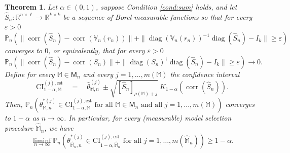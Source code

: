 \documentclass[preprint]{imsart}
\newcommand{\R}{{\mathbb R}}
\newcommand{\eps}{\varepsilon}
\newcommand{\M}{\mathbb M}
\DeclareMathOperator{\diag}{diag}
\DeclareMathOperator{\corr}{corr}
\newtheorem{theorem}{Theorem}[section]
\numberwithin{equation}{section}
\begin{document}
\begin{theorem}\label{thm:fbl}
Let $\alpha \in (0, 1)$, suppose Condition \ref{cond:sum} holds, and let $\hat{S}_n: \R^{n \times \ell} \to \R^{k \times k}$ be a sequence of Borel-measurable functions so that for every $\varepsilon > 0$ 
%
\begin{equation*} 
\mathbb{P}_n \left( \|\corr(\hat{S}_n) - \corr\left(\mathbb{V}_n(r_n)\right)\|  + \|
\diag(\mathbb{V}_n(r_n))^{-1} \diag(\hat{S}_n) - I_k \| \geq \eps \right)
\end{equation*}
%
converges to $0$, or equivalently, that for every $\varepsilon > 0$
%
\begin{equation} \label{eq:consest}
\mathbb{P}_n \left( \|\corr(\hat{S}_n) - \corr\left(S_n\right)\|  + \|
\diag(S_n)^{\dagger} \diag(\hat{S}_n) - I_k \| \geq \varepsilon \right) \to 0.
\end{equation}
%
Define for every $\mathbb{M} \in \mathsf{M}_n$ and every $j = 1, \hdots, m(\mathbb{M})$ the confidence interval
%
\begin{equation*}
\mathrm{CI}_{1-\alpha, \mathbb{M}}^{(j), \mathrm{est}} \quad = \quad \hat{\theta}^{(j)}_{\mathbb{M}, n} \pm \sqrt{[\hat{S}_n]_{\rho(\M) + j }} ~  K_{1-\alpha}\left(\corr(\hat{S}_n)\right).
\end{equation*}
%
Then, 
$
\mathbb{P}_n\left( \theta^{*(j)}_{\mathbb{M}, n} \in \mathrm{CI}_{1-\alpha, \mathbb{M}}^{(j), \mathrm{est}} \text{ for all } \M\in\mathsf{M}_n \text{ and all } j = 1, \hdots, m(\mathbb{M}) \right) 
$
converges to $1-\alpha$ as $n\to\infty$. In particular, for every (measurable) model selection procedure $\hat{\mathbb{M}}_n$, we have
%
\begin{equation}\label{eq:infcov}
\liminf_{n \to \infty} \mathbb{P}_n\left( \theta^{*(j)}_{\hat{\mathbb{M}}_n, n} \in \mathrm{CI}_{1-\alpha, \hat{\mathbb{M}}_n}^{(j), \mathrm{est}} \text{ for all } j = 1, \hdots, m(\hat{\mathbb{M}}_n) \right) \geq 1-\alpha.
\end{equation}
\end{theorem}
\end{document}
